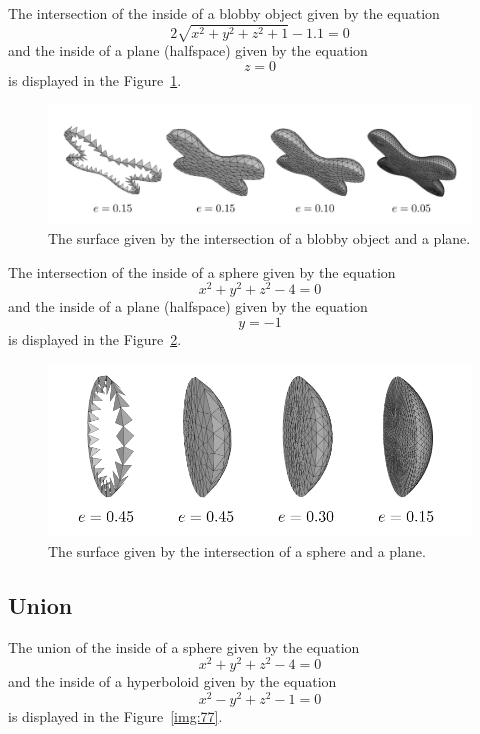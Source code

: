 The intersection of the inside of a blobby object given by the equation
$$2\sqrt{x^2+y^2+z^2+1}-1.1=0$$ 
and the inside of a plane (halfspace) given by the 
equation $$z=0$$ is displayed in the Figure~\ref{img:74}.

\begin{figure}[h!]
    \centerline{\includegraphics[scale=0.5]{images/img74}}
    \caption[The surface given by the intersection of a blobby object and a plane]
    {The surface given by the intersection of a blobby object and a plane.}
    \label{img:74}
\end{figure}

The intersection of the inside of a sphere given by the equation
$$x^2+y^2+z^2-4=0$$ and the inside of a plane (halfspace) given by the 
equation $$y=-1$$ is displayed in the Figure~\ref{img:72}.

\begin{figure}[h!]
    \centerline{\includegraphics[scale=0.5]{images/img72}}
    \caption[The surface given by the intersection of a sphere and a plane]
    {The surface given by the intersection of a sphere and a plane.}
    \label{img:72}
\end{figure}

\subsection{Union}
The union of the inside of a sphere given by the equation
$$x^2+y^2+z^2-4=0$$ and the inside of a hyperboloid given by the 
equation $$x^2-y^2+z^2-1=0$$ is displayed in the Figure~\ref{img:77}.

